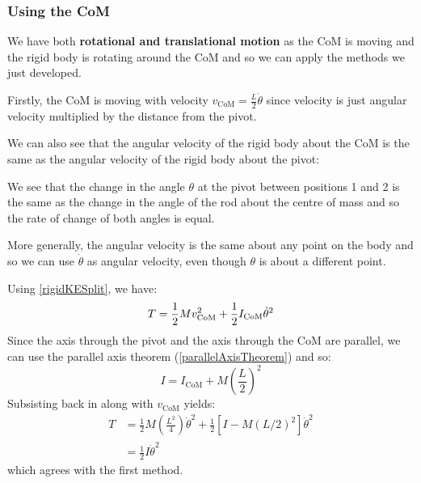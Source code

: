\documentclass[../main.tex]{subfiles}
\begin{document}
\subsubsection{Using the CoM}
We have both \textbf{rotational and translational motion} as the CoM is moving and the rigid body is rotating around the CoM and so we can apply the methods we just developed.

Firstly, the CoM is moving with velocity $v_{\text{CoM}} = \frac{L}{2} \dot{\theta}$ since velocity is just angular velocity multiplied by the distance from the pivot.

We can also see that the angular velocity of the rigid body about the CoM is the same as the angular velocity of the rigid body about the pivot:
\begin{center}
\end{center}
We see that the change in the angle $\theta$ at the pivot between positions 1 and 2 is the same as the change in the angle of the rod about the centre of mass and so the rate of change of both angles is equal.

More generally, the angular velocity is the same about any point on the body and so we can use $\dot{\theta}$ as angular velocity, even though $\theta$ is about a different point.

Using \cref{rigidKESplit}, we have:
\[
  T = \frac{1}{2} M v^{2}_{\text{CoM}} + \frac{1}{2} I_{\text{CoM}}\dot{\theta}^2 \\
\]
Since the axis through the pivot and the axis through the CoM are parallel, we can use the parallel axis theorem (\cref{parallelAxisTheorem}) and so:
\[
  I = I_{\text{CoM}} + M\left(\frac{L}{2}\right)^2
\]
Subsisting back in along with $v_{\text{CoM}}$ yields:
\begin{align*}
  T &= \frac{1}{2} M \left(\frac{L^2}{4}\right) \dot{\theta}^2 + \frac{1}{2}[I - M(L/2)^2]\dot{\theta}^2 \\
    &= \frac{1}{2} I \dot{\theta}^2
\end{align*}
which agrees with the first method.
\end{document}

